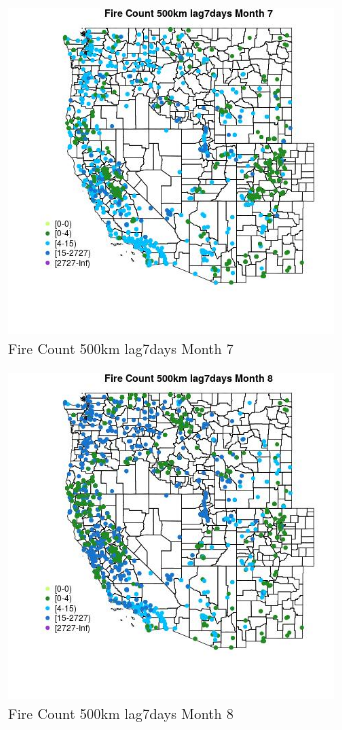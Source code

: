 \begin{figure} 
\centering  
\includegraphics[width=0.77\textwidth]{Code_Outputs/Report_ML_input_PM25_Step4_part_f_de_duplicated_aveswNAs_MapObsMo7Fire_Count_500km_lag7days.jpg} 
\caption{\label{fig:Report_ML_input_PM25_Step4_part_f_de_duplicated_aveswNAsMapObsMo7Fire_Count_500km_lag7days}Fire Count 500km lag7days Month 7} 
\end{figure} 
 

\begin{figure} 
\centering  
\includegraphics[width=0.77\textwidth]{Code_Outputs/Report_ML_input_PM25_Step4_part_f_de_duplicated_aveswNAs_MapObsMo8Fire_Count_500km_lag7days.jpg} 
\caption{\label{fig:Report_ML_input_PM25_Step4_part_f_de_duplicated_aveswNAsMapObsMo8Fire_Count_500km_lag7days}Fire Count 500km lag7days Month 8} 
\end{figure} 
 


